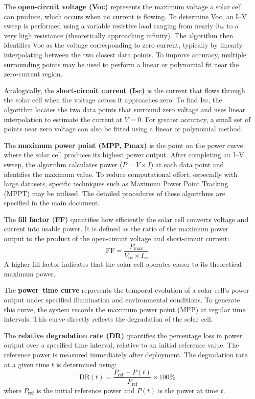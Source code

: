 The \textbf{open-circuit voltage (Voc)} represents the maximum voltage a solar cell can produce, which occurs when no current is flowing. To determine Voc, an I--V sweep is performed using a variable resistive load ranging from nearly $0\,\omega$ to a very high resistance (theoretically approaching infinity). The algorithm then identifies Voc as the voltage corresponding to zero current, typically by linearly interpolating between the two closest data points. To improve accuracy, multiple surrounding points may be used to perform a linear or polynomial fit near the zero-current region.

Analogically, the \textbf{short-circuit current (Isc)} is the current that flows through the solar cell when the voltage across it approaches zero. To find Isc, the algorithm locates the two data points that surround zero voltage and uses linear interpolation to estimate the current at \( V = 0 \). For greater accuracy, a small set of points near zero voltage can also be fitted using a linear or polynomial method.

The \textbf{maximum power point (MPP, Pmax)} is the point on the power curve where the solar cell produces its highest power output. After completing an I--V sweep, the algorithm calculates power (\( P = V \times I \)) at each data point and identifies the maximum value. To reduce computational effort, especially with large datasets, specific techniques such as Maximum Power Point Tracking (MPPT) may be utilised. The detailed procedures of these algorithms are specified in the main document.

The \textbf{fill factor (FF)} quantifies how efficiently the solar cell converts voltage and current into usable power. It is defined as the ratio of the maximum power output to the product of the open-circuit voltage and short-circuit current:
\[
\mathrm{FF} = \frac{P_{\text{max}}}{V_{\text{oc}} \times I_{\text{sc}}}
\]
A higher fill factor indicates that the solar cell operates closer to its theoretical maximum power.

The \textbf{power--time curve} represents the temporal evolution of a solar cell’s power output under specified illumination and environmental conditions. To generate this curve, the system records the maximum power point (MPP) at regular time intervals. This curve directly reflects the degradation of the solar cell.

The \textbf{relative degradation rate (DR)} quantifies the percentage loss in power output over a specified time interval, relative to an initial reference value. The reference power is measured immediately after deployment. The degradation rate at a given time \( t \) is determined using:
\[
\mathrm{DR}(t) = \frac{P_{\text{ref}} - P(t)}{P_{\text{ref}}} \times 100\%
\]
where \( P_{\text{ref}} \) is the initial reference power and \( P(t) \) is the power at time \( t \).

